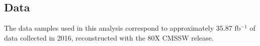 \subsection{Data}

The data samples used in this analysis correspond to approximately $35.87$ fb$^{-1}$ of data collected in 2016, reconstructed with the 80X CMSSW release.


